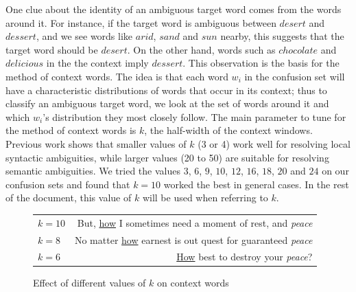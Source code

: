 One clue about the identity of an ambiguous target word comes from the words
around it. For instance, if the target word is ambiguous between \(desert\) and
\(dessert\), and we see words like \(arid\), \(sand\) and \(sun\) nearby, this
suggests that the target word should be \(desert\). On the other hand, words
such as \(chocolate\) and \(delicious\) in the the context imply \(dessert\).
This observation is the basis for the method of context words. The idea is that
each word \(w_i\) in the confusion set will have a characteristic distributions
of words that occur in its context; thus to classify an ambiguous target word,
we look at the set of words around it and which \(w_i\)'s distribution they
most closely follow. The main parameter to tune for the method of context words
is \(k\), the half-width of the context windows. Previous work
\cite{yarowsky1994decision} shows that smaller values of \(k\) (3 or 4) work
well for resolving local syntactic ambiguities, while larger values (20 to 50)
are suitable for resolving semantic ambiguities. We tried the values \(3\),
\(6\), \(9\), \(10\), \(12\), \(16\), \(18\), \(20\) and \(24\) on our
confusion sets and found that \(k = 10\) worked the best in general cases. In
the rest of the document, this value of \(k\) will be used when referring to
\(k\).
\begin{figure}[H]
\caption{Effect of different values of \(k\) on context words}
\begin{tabularx}{\textwidth}{l R}
    \(k = 10\) & But, \ul{how} I sometimes need a moment of rest, and \emph{peace}\\
    \(k = 8\)  & No matter \ul{how} earnest is out quest for guaranteed \emph{peace}\\
    \(k = 6\)  & \ul{How} best to destroy your \emph{peace}?
\end{tabularx}
\end{figure}


